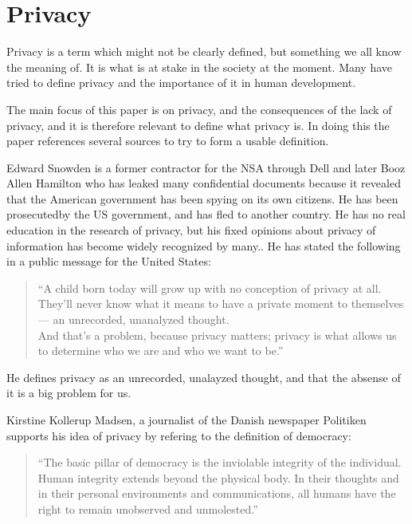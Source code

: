 \section{Privacy}
Privacy is a term which might not be clearly defined, but something we all know the meaning of. It is what is at stake in the society at the moment. Many have tried to define privacy and the importance of it in human development.

The main focus of this paper is on privacy, and the consequences of the lack of privacy, and it is therefore relevant to define what privacy is. In doing this the paper references several sources to try to form a usable definition.

Edward Snowden is a former contractor for the NSA through Dell and later Booz Allen Hamilton who has leaked many confidential documents because it revealed that the American government has been spying on its own citizens. He has been prosecutedby the US government, and has fled to another country. He has no real education in the research of privacy, but his fixed opinions about privacy of information has become widely recognized by many.\cite{website:edward-snowden-basic}. He has stated the following in a public message for the United States:

\blockquote{``A child born today will grow up with no conception of privacy at all. They’ll never know what it means to have a private moment to themselves — an unrecorded, unanalyzed thought.\\ And that’s a problem, because privacy matters; privacy is what allows us to determine who we are and who we want to be.''\cite{interview:edward-snowden-christmas}}
He defines privacy as an unrecorded, unalayzed thought, and that the absense of it is a big problem for us.

Kirstine Kollerup Madsen, a journalist of the Danish newspaper Politiken supports his idea of privacy by refering to the definition of democracy:

\blockquote{``The basic pillar of democracy is the inviolable integrity of the individual. Human integrity extends beyond the physical body. In their thoughts and in their personal environments and communications, all humans have the right to remain unobserved and unmolested.''\cite{website:a-stand-for-democracy}}


